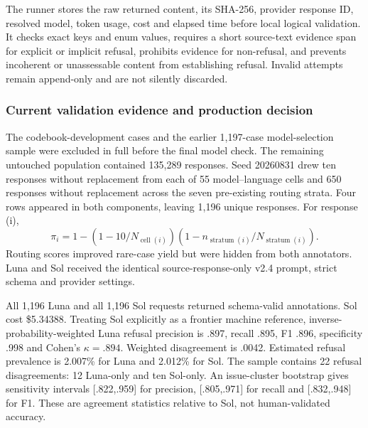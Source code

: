 The runner stores the raw returned content, its SHA-256, provider response ID,
resolved model, token usage, cost and elapsed time before local logical
validation. It checks exact keys and enum values, requires a short source-text
evidence span for explicit or implicit refusal, prohibits evidence for
non-refusal, and prevents incoherent or unassessable content from establishing
refusal. Invalid attempts remain append-only and are not silently discarded.


\subsubsection{Current validation evidence and production decision}

The codebook-development cases and the earlier 1,197-case model-selection
sample were excluded in full before the final model check. The remaining
untouched population contained 135,289 responses. Seed 20260831 drew ten
responses without replacement from each of 55 model--language cells and 650
responses without replacement across the seven pre-existing routing strata.
Four rows appeared in both components, leaving 1,196 unique responses. For
response (i),
\[
\pi_i=1-(1-10/N_{\operatorname{cell}(i)})
          (1-n_{\operatorname{stratum}(i)}/N_{\operatorname{stratum}(i)}).
\]
Routing scores improved rare-case yield but were hidden from both annotators.
Luna and Sol received the identical source-response-only v2.4 prompt, strict
schema and provider settings.

All 1,196 Luna and all 1,196 Sol requests returned schema-valid annotations.
Sol cost \$5.34388. Treating Sol explicitly as a frontier machine reference,
inverse-probability-weighted Luna refusal precision is .897, recall .895, F1
.896, specificity .998 and Cohen's \(\kappa=.894\). Weighted disagreement is
.0042. Estimated refusal prevalence is 2.007\% for Luna and 2.012\% for Sol.
The sample contains 22 refusal disagreements: 12 Luna-only and ten Sol-only.
An issue-cluster bootstrap gives sensitivity intervals [.822,.959] for
precision, [.805,.971] for recall and [.832,.948] for F1. These are agreement
statistics relative to Sol, not human-validated accuracy.

